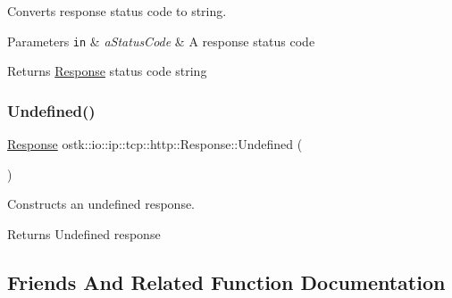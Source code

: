 Converts response status code to string. 


\begin{DoxyParams}[1]{Parameters}
\mbox{\tt in}  & {\em a\+Status\+Code} & A response status code \\
\hline
\end{DoxyParams}
\begin{DoxyReturn}{Returns}
\hyperlink{classostk_1_1io_1_1ip_1_1tcp_1_1http_1_1_response}{Response} status code string 
\end{DoxyReturn}
\mbox{\label{classostk_1_1io_1_1ip_1_1tcp_1_1http_1_1_response_a0a3f62924ffb05edc9bb68351710bb23}} 
\subsubsection{\texorpdfstring{Undefined()}{Undefined()}}
{\footnotesize\ttfamily \hyperlink{classostk_1_1io_1_1ip_1_1tcp_1_1http_1_1_response}{Response} ostk\+::io\+::ip\+::tcp\+::http\+::\+Response\+::\+Undefined (\begin{DoxyParamCaption}{ }\end{DoxyParamCaption})\hspace{0.3cm}{\ttfamily [static]}}



Constructs an undefined response. 

\begin{DoxyReturn}{Returns}
Undefined response 
\end{DoxyReturn}


\subsection{Friends And Related Function Documentation}
\mbox{\label{classostk_1_1io_1_1ip_1_1tcp_1_1http_1_1_response_ae3715558aef62c5b9c3c9971e307dd8e}} 
